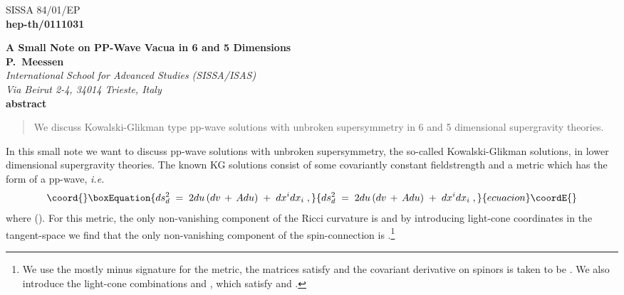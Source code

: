 \documentclass[a4paper,12pt]{article}
\begin{document}
\pagestyle{empty}
%
\begin{flushright}
\small
SISSA 84/01/EP\\
{\bf hep-th/0111031}\\
\normalsize
\end{flushright}

\begin{center}
{\large\bf A Small Note on PP-Wave Vacua in 6 and 5 Dimensions}\\[.5cm]
%
{\bf P.~Meessen}\\[.2cm]%
{\em International School for Advanced Studies (SISSA/ISAS)\\
Via Beirut 2-4, 34014 Trieste, Italy}\\[.5cm]
{\bf abstract}\\
\begin{quote}
{\small 
We discuss Kowalski-Glikman type pp-wave solutions with unbroken supersymmetry in
6 and 5 dimensional supergravity theories.
}
\end{quote}
\end{center}
\vspace{.5cm}
\pagestyle{plain}
In this small note we want to discuss pp-wave solutions
with unbroken supersymmetry, the so-called Kowalski-Glikman solutions,
in lower dimensional supergravity theories. 
The known KG solutions \cite{art:K_1,art:blau,art:K_3} consist of some covariantly constant
fieldstrength and a metric which has the form of a pp-wave, {\em i.e.}
\begin{equation}\coord{}\boxEquation{
\label{eq:wave_metric}
ds_{d}^{2} \;=\; 2du\left( dv\,+\, Adu\right)\;+\; dx^{i}dx_{i} \; ,
}{
ds_{d}^{2} \;=\; 2du\left( dv\,+\, Adu\right)\;+\; dx^{i}dx_{i} \; ,
}{ecuacion}\coordE{}\end{equation}
where \coordHE{} (\coordHE{}). For this metric, the only non-vanishing component
of the Ricci curvature is \coordHE{} and by introducing light-cone coordinates
in the tangent-space we find that the only non-vanishing component of the spin-connection is
\coordHE{}.\footnote{We use the mostly minus
signature for the metric, the \myHighlight{$\gamma$}\coordHE{} matrices satisfy \coordHE{}
and the covariant derivative on spinors is taken to be 
\coordHE{}. We also introduce the light-cone combinations
\coordHE{} and \coordHE{}, which satisfy 
\coordHE{} and \coordHE{}.}
\end{document}

